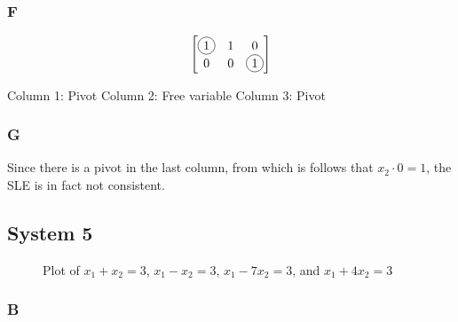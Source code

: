 \documentclass{article}
\begin{document}
\subsubsection*{F}

\[
	\begin{bmatrix}
		\tikz[baseline=(char.base)] \node[draw,circle,inner sep=2pt] (char) {1}; & 1 & 0                                                                         \\
		0                                                                        & 0 & \tikz[baseline=(char.base)] \node[draw,circle,inner sep=2pt] (char)  {1};
	\end{bmatrix}
\]

Column 1: Pivot
Column 2: Free variable
Column 3: Pivot

\subsubsection*{G}

Since there is a pivot in the last column, from which is follows that $x_2 \cdot 0 = 1$, the SLE is in fact not consistent.

\subsection*{System 5}

\begin{figure}[h!]
	\centering
	\caption{Plot of $x_1 + x_2 = 3$, $x_1 - x_2 = 3$, $x_1 - 7x_2 = 3$, and $x_1 + 4x_2 = 3$}
	\label{fig:plot5}
\end{figure}

\subsubsection*{B}
\end{document}
